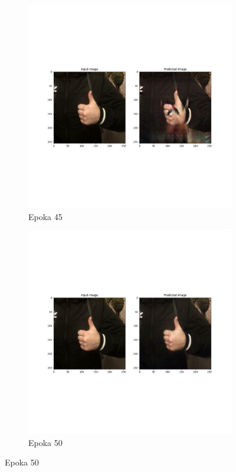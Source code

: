 \documentclass[12pt]{article}
\begin{document}
\begin{sloppypar}
{{\begin{figure}
    \end{figure}
    \begin{figure}
      \begin{subfigure}{.5\textwidth}
        \centering
        \includegraphics[width=.8\linewidth]{cycle-gan/epoch-45.jpg}
        \caption{Epoka 45}
        \label{fig:cg-45}
      \end{subfigure}%
      \begin{subfigure}{.5\textwidth}
        \centering
        \includegraphics[width=.8\linewidth]{cycle-gan/epoch-50.jpg}
        \caption{Epoka 50}
        \label{fig:cg-50}
      \end{subfigure}

\end{figure}}}
\end{sloppypar}
\end{document}
